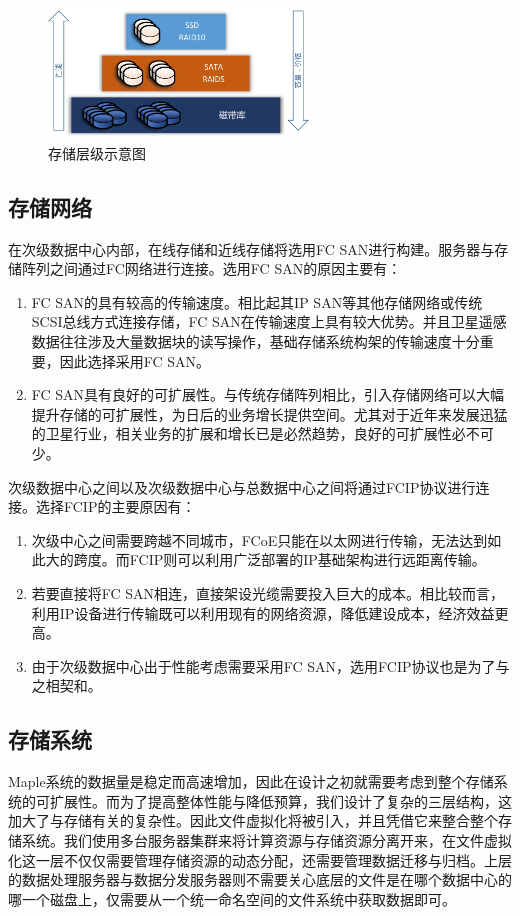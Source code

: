 \documentclass{article}
\begin{document}
\begin{figure}[H]
\centering 
\includegraphics[width=0.618\textwidth]{pic/storage.jpg}
\caption{存储层级示意图}
\label{storage}
\end{figure}

\subsection{存储网络}
在次级数据中心内部，在线存储和近线存储将选用FC SAN进行构建。服务器与存储阵列之间通过FC网络进行连接。选用FC SAN的原因主要有：
\begin{enumerate}
\item FC SAN的具有较高的传输速度。相比起其IP SAN等其他存储网络或传统SCSI总线方式连接存储，FC SAN在传输速度上具有较大优势。并且卫星遥感数据往往涉及大量数据块的读写操作，基础存储系统构架的传输速度十分重要，因此选择采用FC SAN。
\item FC SAN具有良好的可扩展性。与传统存储阵列相比，引入存储网络可以大幅提升存储的可扩展性，为日后的业务增长提供空间。尤其对于近年来发展迅猛的卫星行业，相关业务的扩展和增长已是必然趋势，良好的可扩展性必不可少。
\end{enumerate}

次级数据中心之间以及次级数据中心与总数据中心之间将通过FCIP协议进行连接。选择FCIP的主要原因有：
\begin{enumerate}
\item 次级中心之间需要跨越不同城市，FCoE只能在以太网进行传输，无法达到如此大的跨度。而FCIP则可以利用广泛部署的IP基础架构进行远距离传输。
\item 若要直接将FC SAN相连，直接架设光缆需要投入巨大的成本。相比较而言，利用IP设备进行传输既可以利用现有的网络资源，降低建设成本，经济效益更高。
\item 由于次级数据中心出于性能考虑需要采用FC SAN，选用FCIP协议也是为了与之相契和。
\end{enumerate}

\subsection{存储系统}
Maple系统的数据量是稳定而高速增加，因此在设计之初就需要考虑到整个存储系统的可扩展性。而为了提高整体性能与降低预算，我们设计了复杂的三层结构，这加大了与存储有关的复杂性。因此文件虚拟化将被引入，并且凭借它来整合整个存储系统。我们使用多台服务器集群来将计算资源与存储资源分离开来，在文件虚拟化这一层不仅仅需要管理存储资源的动态分配，还需要管理数据迁移与归档。上层的数据处理服务器与数据分发服务器则不需要关心底层的文件是在哪个数据中心的哪一个磁盘上，仅需要从一个统一命名空间的文件系统中获取数据即可。
\end{document}
